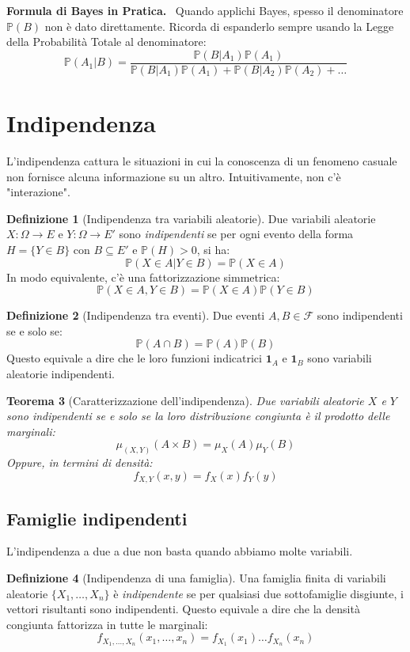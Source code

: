 \documentclass[11pt, a4paper]{report}
\theoremstyle{plain}
\newtheorem{theorem}{Teorema}[chapter]
\theoremstyle{definition}
\newtheorem{definition}[theorem]{Definizione}
\theoremstyle{remark}
\newenvironment{hint}[1][Hint]
{\begin{mdframed}[backgroundcolor=blue!5, linecolor=blue!50, linewidth=2pt, topline=false, rightline=false, bottomline=false]
\textbf{\textsf{#1.}}\ }
{\end{mdframed}}
\newcommand{\PP}{\mathbb{P}}
\newcommand{\F}{\mathcal{F}}
\newcommand{\1}{\mathbf{1}}
\begin{document}
\begin{hint}[Formula di Bayes in Pratica]
    Quando applichi Bayes, spesso il denominatore $\PP(B)$ non è dato direttamente. Ricorda di espanderlo sempre usando la Legge della Probabilità Totale al denominatore: 
    \[ \PP(A_1|B) = \frac{\PP(B|A_1)\PP(A_1)}{\PP(B|A_1)\PP(A_1) + \PP(B|A_2)\PP(A_2) + \dots} \]
\end{hint}

\section{Indipendenza}

L'indipendenza cattura le situazioni in cui la conoscenza di un fenomeno casuale non fornisce alcuna informazione su un altro. Intuitivamente, non c'è "interazione".

\begin{definition}[Indipendenza tra variabili aleatorie]
Due variabili aleatorie $X : \Omega \to E$ e $Y : \Omega \to E'$ sono \emph{indipendenti} se per ogni evento della forma $H = \{Y \in B\}$ con $B \subseteq E'$ e $\PP(H)>0$, si ha:
\[ \PP(X \in A | Y \in B) = \PP(X \in A) \]
In modo equivalente, c'è una fattorizzazione simmetrica:
\[ \PP(X \in A, Y \in B) = \PP(X \in A)\PP(Y \in B) \]
\end{definition}

\begin{definition}[Indipendenza tra eventi]
Due eventi $A, B \in \F$ sono indipendenti se e solo se:
\[ \PP(A \cap B) = \PP(A)\PP(B) \]
Questo equivale a dire che le loro funzioni indicatrici $\mathbf{1}_A$ e $\mathbf{1}_B$ sono variabili aleatorie indipendenti.
\end{definition}
\begin{theorem}[Caratterizzazione dell'indipendenza]
Due variabili aleatorie $X$ e $Y$ sono indipendenti se e solo se la loro distribuzione congiunta è il prodotto delle marginali:
\[ \mu_{(X,Y)}(A \times B) = \mu_X(A)\mu_Y(B) \]
Oppure, in termini di densità:
\[ f_{X,Y}(x, y) = f_X(x)f_Y(y) \]
\end{theorem}

\subsection{Famiglie indipendenti}

L'indipendenza a due a due non basta quando abbiamo molte variabili.

\begin{definition}[Indipendenza di una famiglia]
Una famiglia finita di variabili aleatorie $\{X_1, \dots, X_n\}$ è \emph{indipendente} se per qualsiasi due sottofamiglie disgiunte, i vettori risultanti sono indipendenti. Questo equivale a dire che la densità congiunta fattorizza in tutte le marginali:
\[ f_{X_1, \dots, X_n}(x_1, \dots, x_n) = f_{X_1}(x_1) \dots f_{X_n}(x_n) \]
\end{definition}
\end{document}
